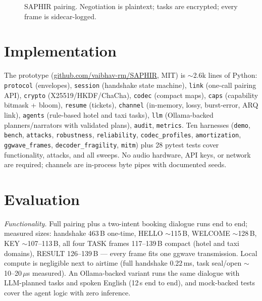 \documentclass[11pt]{article}
\begin{document}
\begin{figure}[h]
\centering
{}
\caption{SAPHIR pairing. Negotiation is plaintext; tasks are encrypted; every frame is sidecar-logged.}
\label{fig:hs}
\end{figure}

\section{Implementation}
The prototype (\url{github.com/vaibhav-rm/SAPHIR}, MIT) is $\sim$2.6k lines of
Python: \texttt{protocol} (envelopes), \texttt{session} (handshake state
machine), \texttt{link} (one-call pairing API), \texttt{crypto} (X25519/HKDF/ChaCha), \texttt{codec} (compact maps),
\texttt{caps} (capability bitmask + bloom), \texttt{resume} (tickets),
\texttt{channel} (in-memory, lossy, burst-error, ARQ link), \texttt{agents}
(rule-based hotel and taxi tasks), \texttt{llm} (Ollama-backed planners/narrators
with validated plans), \texttt{audit}, \texttt{metrics}. Ten harnesses
(\texttt{demo}, \texttt{bench}, \texttt{attacks}, \texttt{robustness},
\texttt{reliability}, \texttt{codec\_profiles}, \texttt{amortization},
\texttt{ggwave\_frames}, \texttt{decoder\_fragility}, \texttt{mitm}) plus 28
pytest tests cover functionality, attacks, and all sweeps. No audio hardware,
API keys, or network are required; channels are in-process byte pipes with
documented seeds.

\section{Evaluation}
\emph{Functionality.} Full pairing plus a two-intent booking dialogue runs end
to end; measured sizes: handshake 463\,B one-time, HELLO $\sim$115\,B, WELCOME
$\sim$128\,B, KEY $\sim$107--113\,B, all four TASK frames 117--139\,B compact (hotel and
taxi domains), RESULT 126--139\,B --- every frame fits one ggwave transmission.
Local compute is negligible next to airtime (full handshake 0.22\,ms,
task seal/open $\sim$10--20\,$\mu$s measured). An Ollama-backed variant runs the
same dialogue with LLM-planned tasks and spoken English (12\,s end to end), and
mock-backed tests cover the agent logic with zero inference.
\end{document}

